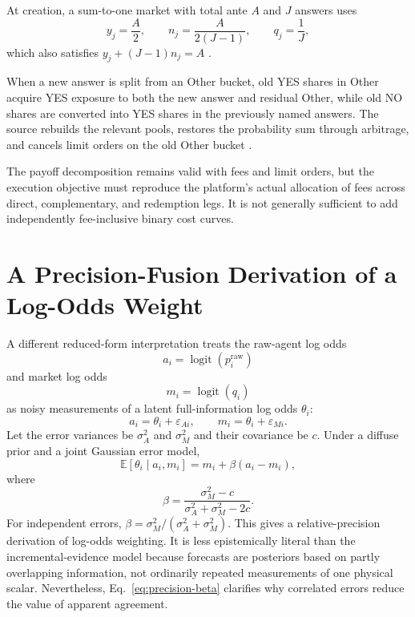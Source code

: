 \documentclass[journal,a4paper]{IEEEtran}
\newcommand{\E}{\mathbb{E}}
\newcommand{\logit}{\operatorname{logit}}
\begin{document}
At creation, a sum-to-one market with total ante $A$ and $J$ answers uses
\begin{equation}
y_j=\frac{A}{2},
\qquad
n_j=\frac{A}{2(J-1)},
\qquad
q_j=\frac{1}{J},
\end{equation}
which also satisfies $y_j+(J-1)n_j=A$ \cite{manifold-contract}.

When a new answer is split from an Other bucket, old YES shares in Other acquire YES exposure to both the new answer and residual Other, while old NO shares are converted into YES shares in the previously named answers. The source rebuilds the relevant pools, restores the probability sum through arbitrage, and cancels limit orders on the old Other bucket \cite{manifold-answer}.

The payoff decomposition remains valid with fees and limit orders, but the execution objective must reproduce the platform's actual allocation of fees across direct, complementary, and redemption legs. It is not generally sufficient to add independently fee-inclusive binary cost curves.

\section{A Precision-Fusion Derivation of a Log-Odds Weight}
A different reduced-form interpretation treats the raw-agent log odds
\begin{equation}
a_i=\logit(p_i^{\mathrm{raw}})
\end{equation}
and market log odds
\begin{equation}
m_i=\logit(q_i)
\end{equation}
as noisy measurements of a latent full-information log odds $\theta_i$:
\begin{equation}
a_i=\theta_i+\varepsilon_{Ai},
\qquad
m_i=\theta_i+\varepsilon_{Mi}.
\end{equation}
Let the error variances be $\sigma_A^2$ and $\sigma_M^2$ and their covariance be $c$. Under a diffuse prior and a joint Gaussian error model,
\begin{equation}
\E[\theta_i\mid a_i,m_i]
=
m_i+\beta(a_i-m_i),
\end{equation}
where
\begin{equation}
\beta
=
\frac{\sigma_M^2-c}
{\sigma_A^2+\sigma_M^2-2c}.
\label{eq:precision-beta}
\end{equation}
For independent errors, $\beta=\sigma_M^2/(\sigma_A^2+\sigma_M^2)$. This gives a relative-precision derivation of log-odds weighting. It is less epistemically literal than the incremental-evidence model because forecasts are posteriors based on partly overlapping information, not ordinarily repeated measurements of one physical scalar. Nevertheless, Eq.~\eqref{eq:precision-beta} clarifies why correlated errors reduce the value of apparent agreement.
\end{document}
